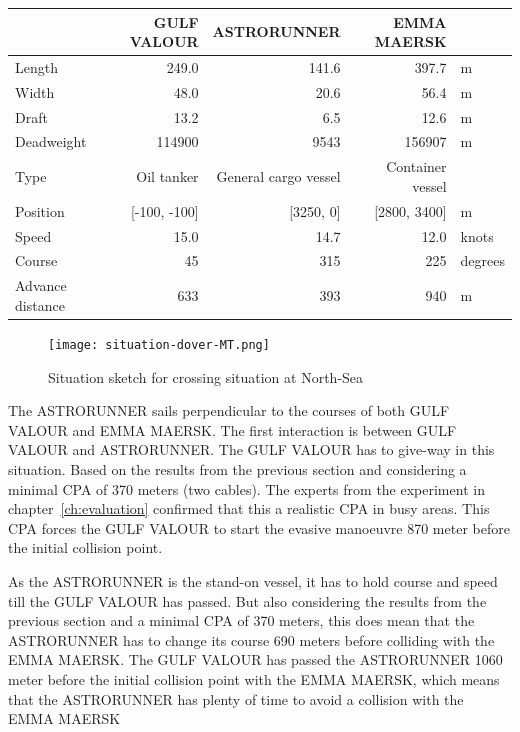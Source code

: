 \begin{table}[p]
	\centering
	\begin{tabular}{l | r r r l}
		\toprule
		& GULF VALOUR & ASTRORUNNER & EMMA MAERSK & \\
		\midrule
		Length     & 249.0    & 141.6    &  397.7 & m \\
		Width     & 48.0    & 20.6    &  56.4 & m  \\
		Draft     & 13.2    & 6.5    &  12.6 & m  \\
		Deadweight & 114900 & 9543 & 156907 & m \\
		Type     & Oil tanker    & General cargo vessel    &  Container vessel & \\
		\midrule
		Position& [-100, -100]    & [3250, 0]    &  [2800, 3400] & m \\
		Speed     & 15.0    & 14.7    &  12.0 & knots\\
		Course     & 45    & 315    &  225 & degrees \\
		Advance distance & 633 & 393 & 940 & m \\
		\bottomrule
	\end{tabular}
	\label{tab:info-dover-MT}
\end{table}

\begin{figure}[p]
	\centering
	\texttt{[image: situation-dover-MT.png]}
	\caption{Situation sketch for crossing situation at North-Sea}
	\label{fig:crossing-dover-MT}
\end{figure}

The ASTRORUNNER sails perpendicular to the courses of both GULF VALOUR and EMMA MAERSK. The first interaction is between GULF VALOUR and ASTRORUNNER. The GULF VALOUR has to give-way in this situation. Based on the results from the previous section and considering a minimal CPA of 370 meters (two cables). The experts from the experiment in chapter~\ref{ch:evaluation} confirmed that this a realistic CPA in busy areas.
This CPA forces the GULF VALOUR to start the evasive manoeuvre 870 meter before the initial collision point. 

As the ASTRORUNNER is the stand-on vessel, it has to hold course and speed till the GULF VALOUR has passed. But also considering the results from the previous section and a minimal CPA of 370 meters, this does mean that the ASTRORUNNER has to change its course 690 meters before colliding with the EMMA MAERSK. The GULF VALOUR has passed the ASTRORUNNER 1060 meter before the initial collision point with the EMMA MAERSK, which means that the ASTRORUNNER has plenty of time to avoid a collision with the EMMA MAERSK

